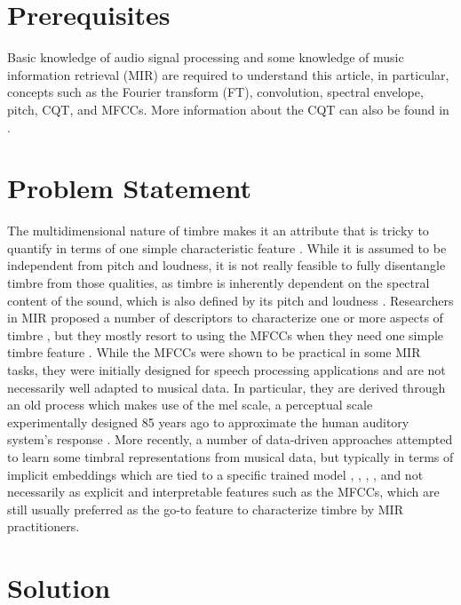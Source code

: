 \documentclass[journal]{IEEEtran}
\begin{document}
\section{Prerequisites}

Basic knowledge of audio signal processing and some knowledge of music information retrieval (MIR) \cite{mueller2007} are required to understand this article, in particular, concepts such as the Fourier transform (FT), convolution, spectral envelope, pitch, CQT, and MFCCs. More information about the CQT can also be found in \cite{brown1991, brown1992}.


\section{Problem Statement}

The multidimensional nature of timbre makes it an attribute that is tricky to quantify in terms of one simple characteristic feature \cite{grey1977}. While it is assumed to be independent from pitch and loudness, it is not really feasible to fully disentangle timbre from those qualities, as timbre is inherently dependent on the spectral content of the sound, which is also defined by its pitch and loudness \cite{moore2004}. Researchers in MIR proposed a number of descriptors to characterize one or more aspects of timbre \cite{peeters2011}, but they mostly resort to using the MFCCs when they need one simple timbre feature \cite{mueller2007}. While the MFCCs were shown to be practical in some MIR tasks, they were initially designed for speech processing applications \cite{mermelstein1976} and are not necessarily well adapted to musical data. In particular, they are derived through an old process which makes use of the mel scale, a perceptual scale experimentally designed 85 years ago to approximate the human auditory system's response \cite{stevens1937}. More recently, a number of data-driven approaches attempted to learn some timbral representations from musical data, but typically in terms of implicit embeddings which are tied to a specific trained model \cite{engel2017}, \cite{pons2017}, \cite{hung2019}, \cite{luo2019}, \cite{lee2020} and not necessarily as explicit and interpretable features such as the MFCCs, which are still usually preferred as the go-to feature to characterize timbre by MIR practitioners.


\section{Solution}
\end{document}
